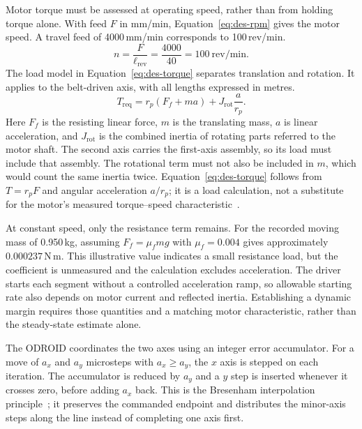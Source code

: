 Motor torque must be assessed at operating speed, rather than from holding torque alone. With feed $F$ in mm/min, Equation~\ref{eq:des-rpm} gives the motor speed. A travel feed of 4000\,mm/min corresponds to 100\,rev/min.
\begin{equation}
n=\frac{F}{\ell_{\mathrm{rev}}}=\frac{4000}{40}=100\ \mathrm{rev/min}.
\label{eq:des-rpm}
\end{equation}
The load model in Equation~\ref{eq:des-torque} separates translation and rotation. It applies to the belt-driven axis, with all lengths expressed in metres.
\begin{equation}
T_{\mathrm{req}}=r_p(F_f+ma)+J_{\mathrm{rot}}\frac{a}{r_p}.
\label{eq:des-torque}
\end{equation}
Here $F_f$ is the resisting linear force, $m$ is the translating mass, $a$ is linear acceleration, and $J_{\mathrm{rot}}$ is the combined inertia of rotating parts referred to the motor shaft. The second axis carries the first-axis assembly, so its load must include that assembly. The rotational term must not also be included in $m$, which would count the same inertia twice. Equation~\ref{eq:des-torque} follows from $T=r_pF$ and angular acceleration $a/r_p$; it is a load calculation, not a substitute for the motor's measured torque--speed characteristic~\cite{acarnley2002}.

At constant speed, only the resistance term remains. For the recorded moving mass of 0.950\,kg, assuming $F_f=\mu_fmg$ with $\mu_f=0.004$ gives approximately $0.000237$\,N\,m. This illustrative value indicates a small resistance load, but the coefficient is unmeasured and the calculation excludes acceleration. The driver starts each segment without a controlled acceleration ramp, so allowable starting rate also depends on motor current and reflected inertia. Establishing a dynamic margin requires those quantities and a matching motor characteristic, rather than the steady-state estimate alone.

The ODROID coordinates the two axes using an integer error accumulator. For a move of $a_x$ and $a_y$ microsteps with $a_x\geq a_y$, the $x$ axis is stepped on each iteration. The accumulator is reduced by $a_y$ and a $y$ step is inserted whenever it crosses zero, before adding $a_x$ back. This is the Bresenham interpolation principle~\cite[p.~28]{bresenham1965}; it preserves the commanded endpoint and distributes the minor-axis steps along the line instead of completing one axis first.

